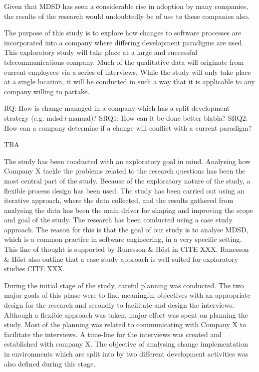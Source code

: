 \documentclass[times, 10pt,twocolumn]{Article}
\begin{document}
Given that MDSD has seen a considerable rise in adoption by many companies\cite{millermda}, the results of the research would undoubtedly be of use to these companies also.

The purpose of this study is to explore how changes to software processes are incorporated into a company where differing development paradigms are used. This exploratory study will take place at a large and successful telecommunications company. Much of the qualitative data will originate from current employees via a series of interviews. While the study will only take place at a single location, it will be conducted in such a way that it is applicable to any company willing to partake. 

RQ: How is change managed in a company which has a split development strategy (e.g. mdsd+manual)?
SRQ1: How can it be done better blabla?
SRQ2: How can a company determine if a change will conflict with a current paradigm?

TBA
\newpage



The study has been conducted with an exploratory goal in mind. Analysing how Company X tackle the problems related to the research questions has been the most central part of the study. Because of the exploratory nature of the study, a flexible process design has been used. The study has been carried out using an iterative approach, where the data collected, and the results gathered from analysing the data has been the main driver for shaping and improving the scope and goal of the study. The research has been conducted using a case study approach. The reason for this is that the goal of our study is to analyse MDSD, which is a common practice in software engineering, in a very specific setting. This line of thought is supported by Runesson \& Höst in CITE XXX. Runesson \& Höst also outline that a case study approach is well-suited for exploratory studies CITE XXX. 

During the initial stage of the study, careful planning was conducted. The two major goals of this phase were to find meaningful objectives with an appropriate design for the research and secondly to facilitate and design the interviews. Although a flexible approach was taken, major effort was spent on planning the study. Most of the planning was related to communicating with Company X to facilitate the interviews. A time-line for the interviews was created and established with company X. The objective of analysing change implementation in environments which are split into by two different development activities was also defined during this stage. 
\end{document}
